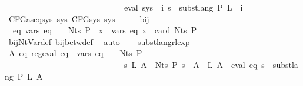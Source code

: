 \begin{isabellebody}
\ \ \ \ \ \ \ \ \ \ \ \ \ \ \ \ \ \ \ \ \ \ \ \ \ \ \ \ {\isasymlongrightarrow}\ eval\ {\isacharparenleft}{\kern0pt}sys\ {\isacharbang}{\kern0pt}\ i{\isacharparenright}{\kern0pt}\ s\ {\isacharequal}{\kern0pt}\ subst{\isacharunderscore}{\kern0pt}lang\ P\ L\ {\isacharparenleft}{\kern0pt}{\isasymgamma}\ i{\isacharparenright}{\kern0pt}{\isacharparenright}{\kern0pt}{\isacharparenright}{\kern0pt}{\isachardoublequoteclose}\isanewline
\isanewline
{}\isamarkupfalse%
\ CFG{\isacharunderscore}{\kern0pt}as{\isacharunderscore}{\kern0pt}eq{\isacharunderscore}{\kern0pt}sys{\isacharcolon}{\kern0pt}\ {\isachardoublequoteopen}{\isasymexists}sys{\isachardot}{\kern0pt}\ CFG{\isacharunderscore}{\kern0pt}sys\ sys{\isachardoublequoteclose}\isanewline
%
\isadelimproof
%
\endisadelimproof
%
\isatagproof
{}\isamarkupfalse%
\ {\isacharminus}{\kern0pt}\isanewline
\ \ \isamarkupfalse%
\ bij{\isacharunderscore}{\kern0pt}{\isasymgamma}{\isacharunderscore}{\kern0pt}{\isasymgamma}{\isacharprime}{\kern0pt}\ \isamarkupfalse%
\ {\isacharasterisk}{\kern0pt}{\isacharcolon}{\kern0pt}\ {\isachardoublequoteopen}{\isasymAnd}eq{\isachardot}{\kern0pt}\ vars\ eq\ {\isasymsubseteq}\ {\isasymgamma}{\isacharprime}{\kern0pt}\ {\isacharbackquote}{\kern0pt}\ Nts\ P\ {\isasymLongrightarrow}\ {\isasymforall}x\ {\isasymin}\ vars\ eq{\isachardot}{\kern0pt}\ x\ {\isacharless}{\kern0pt}\ card\ {\isacharparenleft}{\kern0pt}Nts\ P{\isacharparenright}{\kern0pt}{\isachardoublequoteclose}\isanewline
\ \ \ \ \isamarkupfalse%
\ bij{\isacharunderscore}{\kern0pt}Nt{\isacharunderscore}{\kern0pt}Var{\isacharunderscore}{\kern0pt}def\ bij{\isacharunderscore}{\kern0pt}betw{\isacharunderscore}{\kern0pt}def\ \isamarkupfalse%
\ auto\isanewline
\ \ \isamarkupfalse%
\ subst{\isacharunderscore}{\kern0pt}lang{\isacharunderscore}{\kern0pt}rlexp\ \isamarkupfalse%
\ {\isachardoublequoteopen}{\isasymforall}A{\isachardot}{\kern0pt}\ {\isasymexists}eq{\isachardot}{\kern0pt}\ reg{\isacharunderscore}{\kern0pt}eval\ eq\ {\isasymand}\ vars\ eq\ {\isasymsubseteq}\ {\isasymgamma}{\isacharprime}{\kern0pt}\ {\isacharbackquote}{\kern0pt}\ Nts\ P\ {\isasymand}\isanewline
\ \ \ \ \ \ \ \ \ \ \ \ \ \ \ \ \ \ \ \ \ \ \ \ \ \ \ \ \ {\isacharparenleft}{\kern0pt}{\isasymforall}s\ L{\isachardot}{\kern0pt}\ {\isacharparenleft}{\kern0pt}{\isasymforall}A\ {\isasymin}\ Nts\ P{\isachardot}{\kern0pt}\ s\ {\isacharparenleft}{\kern0pt}{\isasymgamma}{\isacharprime}{\kern0pt}\ A{\isacharparenright}{\kern0pt}\ {\isacharequal}{\kern0pt}\ L\ A{\isacharparenright}{\kern0pt}\ {\isasymlongrightarrow}\ eval\ eq\ s\ {\isacharequal}{\kern0pt}\ subst{\isacharunderscore}{\kern0pt}lang\ P\ L\ A{\isacharparenright}{\kern0pt}{\isachardoublequoteclose}\isanewline

\end{isabellebody}
